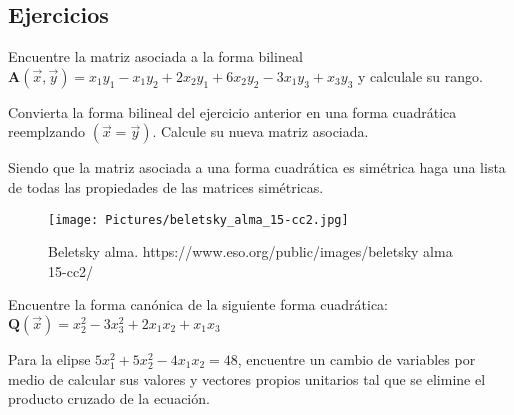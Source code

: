 \subsection{Ejercicios}

\bigskip


 \bigskip

\begin{exercise}
\item
Encuentre la matriz asociada a la forma bilineal
$\mathbf{A}(\vec{x},\vec{y})= x_1y_1-x_1y_2 + 2x_2y_1 + 6x_2y_2 - 3x_1y_3 + x_3y_3$
y calculale su rango.
\end{exercise}
\begin{exercise}
\item
Convierta la forma bilineal del ejercicio anterior en una forma cuadrática reemplzando $(\vec{x}=\vec{y})$.
Calcule su nueva matriz asociada.
\end{exercise}
\begin{exercise}
\item
Siendo que la matriz asociada a una forma cuadrática es simétrica haga una lista de todas las propiedades de las matrices
simétricas.
\end{exercise}

\begin{figure}
    \centering
    \texttt{[image: Pictures/beletsky\_alma\_15-cc2.jpg]}
\caption{Beletsky alma. https://www.eso.org/public/images/beletsky alma 15-cc2/}    
    \label{TELE}
\end{figure}

\begin{exercise}
\item
Encuentre la forma canónica de la siguiente forma cuadrática:
$\mathbf{Q}(\vec{x})= x^2_2-3x^2_3 + 2x_1x_2 + x_1x_3$
\end{exercise}
\begin{exercise}
\item
Para la elipse $5x^2_1+5x^2_2 - 4x_1x_2 =48$, encuentre un cambio de variables por medio de calcular sus valores y vectores propios
unitarios tal que se elimine el producto cruzado de la ecuación.
\end{exercise}

